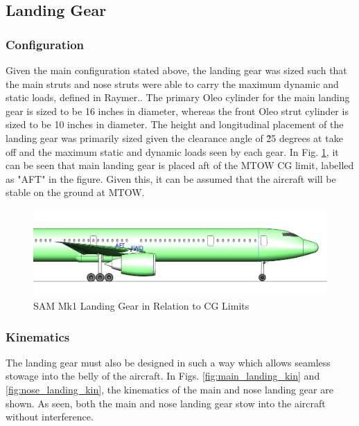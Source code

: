 \subsection{Landing Gear}
\label{section: Landing Gear}
\subsubsection{Configuration}

Given the main configuration stated above, the landing gear was sized such that the main struts and nose struts were able to carry the maximum dynamic and static loads, defined in Raymer.\cite{raymer}. The primary Oleo cylinder for the main landing gear is sized to be 16 inches in diameter, whereas the front Oleo strut cylinder is sized to be 10 inches in diameter. The height and longitudinal placement of the landing gear was primarily sized given the clearance angle of \~25 degrees at take off and the maximum static and dynamic loads seen by each gear. \cite{raymer} In Fig. \ref{fig:landing_gear_CG}, it can be seen that main landing gear is placed aft of the MTOW CG limit, labelled as "AFT" in the figure. Given this, it can be assumed that the aircraft will be stable on the ground at MTOW.

\begin{figure}[!h]
    \centering
    \includegraphics[width=\linewidth]{Photos/landinggear/LG Close Side View with CG.PNG}
    \caption{SAM Mk1 Landing Gear in Relation to CG Limits}
    \label{fig:landing_gear_CG}
\end{figure}


\subsubsection{Kinematics}
The landing gear must also be designed in such a way which allows seamless stowage into the belly of the aircraft. In Figs. \ref{fig:main_landing_kin} and \ref{fig:nose_landing_kin}, the kinematics of the main and nose landing gear are shown. As seen, both the main and nose landing gear stow into the aircraft without interference.

